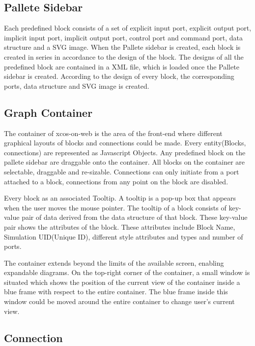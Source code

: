 \documentclass[conference]{IEEEtran}
\begin{document}
\subsection{Pallete Sidebar}

Each predefined block consists of a set of explicit input port, explicit output port, implicit input port, implicit output port, control port and command port, data structure and a SVG image. When the Pallete sidebar is created, each block is created in series in accordance to the design of the block. The designs of all the predefined block are contained in a XML file, which is loaded once the Pallete sidebar is created. According to the design of every block, the corresponding ports, data structure and SVG image is created.

\subsection{Graph Container}

The container of xcos-on-web is the area of the front-end where different graphical layouts of blocks and connections could be made. Every entity(Blocks, connections) are represented as Javascript Objects. Any predefined block on the pallete sidebar are draggable onto the container. All blocks on the container are selectable, draggable and re-sizable. Connections can only initiate from a port attached to a block, connections from any point on the block are disabled.

Every block as an associated Tooltip. A tooltip is a pop-up box that appears when the user moves the mouse pointer. The tooltip of a block consists of key-value pair of data derived from the data structure of that block. These key-value pair shows the attributes of the block. These attributes include Block Name, Simulation
UID(Unique ID), different style attributes and types and number of ports.

The container extends beyond the limits of the available screen, enabling expandable diagrams. On the top-right corner of the container, a small window is situated which shows the position of the current view of the container inside a blue frame with respect to the entire container. The blue frame inside this window could be moved around the entire container to change user's current view.

\subsection{Connection}
\end{document}
